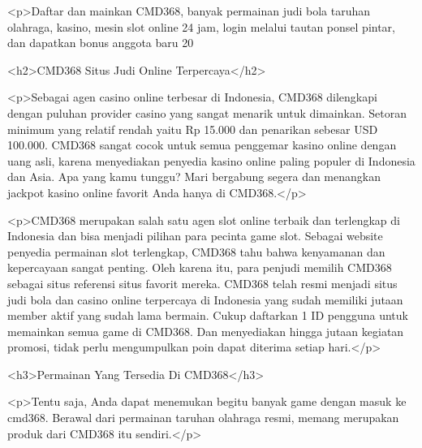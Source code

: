 <p>Daftar dan mainkan CMD368, banyak permainan judi bola taruhan olahraga, kasino, mesin slot online 24 jam, login melalui tautan ponsel pintar, dan dapatkan bonus anggota baru 20%



<h2>CMD368 Situs Judi Online Terpercaya</h2>



<p>Sebagai agen casino online terbesar di Indonesia, CMD368 dilengkapi dengan puluhan provider casino yang sangat menarik untuk dimainkan. Setoran minimum yang relatif rendah yaitu Rp 15.000 dan penarikan sebesar USD 100.000. CMD368 sangat cocok untuk semua penggemar kasino online dengan uang asli, karena menyediakan penyedia kasino online paling populer di Indonesia dan Asia. Apa yang kamu tunggu? Mari bergabung segera dan menangkan jackpot kasino online favorit Anda hanya di CMD368.</p>



<p>CMD368 merupakan salah satu agen slot online terbaik dan terlengkap di Indonesia dan bisa menjadi pilihan para pecinta game slot. Sebagai website penyedia permainan slot terlengkap, CMD368 tahu bahwa kenyamanan dan kepercayaan sangat penting. Oleh karena itu, para penjudi memilih CMD368 sebagai situs referensi situs favorit mereka. CMD368 telah resmi menjadi situs judi bola dan casino online terpercaya di Indonesia yang sudah memiliki jutaan member aktif yang sudah lama bermain. Cukup daftarkan 1 ID pengguna untuk memainkan semua game di CMD368. Dan menyediakan hingga jutaan kegiatan promosi, tidak perlu mengumpulkan poin dapat diterima setiap hari.</p>



<h3>Permainan Yang Tersedia Di CMD368</h3>



<p>Tentu saja, Anda dapat menemukan begitu banyak game dengan masuk ke cmd368. Berawal dari permainan taruhan olahraga resmi, memang merupakan produk dari CMD368 itu sendiri.</p>



